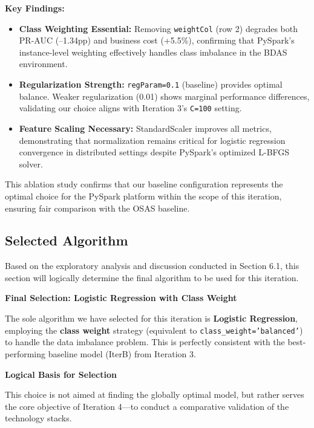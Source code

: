 \documentclass[sigplan,screen]{acmart}
\begin{document}
\textbf{Key Findings:}
\begin{itemize}
\item \textbf{Class Weighting Essential:} Removing \texttt{weightCol} (row 2) degrades both PR-AUC (--1.34pp) and business cost (+5.5\%), confirming that PySpark's instance-level weighting effectively handles class imbalance in the BDAS environment.
\item \textbf{Regularization Strength:} \texttt{regParam=0.1} (baseline) provides optimal balance. Weaker regularization (0.01) shows marginal performance differences, validating our choice aligns with Iteration 3's \texttt{C=100} setting.
\item \textbf{Feature Scaling Necessary:} StandardScaler improves all metrics, demonstrating that normalization remains critical for logistic regression convergence in distributed settings despite PySpark's optimized L-BFGS solver.
\end{itemize}

This ablation study confirms that our baseline configuration represents the optimal choice for the PySpark platform within the scope of this iteration, ensuring fair comparison with the OSAS baseline.

\subsection{Selected Algorithm}

Based on the exploratory analysis and discussion conducted in Section 6.1, this section will logically determine the final algorithm to be used for this iteration.

\textbf{Final Selection: Logistic Regression with Class Weight}

The sole algorithm we have selected for this iteration is \textbf{Logistic Regression}, employing the \textbf{class weight} strategy (equivalent to \texttt{class\_weight='balanced'}) to handle the data imbalance problem. This is perfectly consistent with the best-performing baseline model (IterB) from Iteration 3.

\textbf{Logical Basis for Selection}

This choice is not aimed at finding the globally optimal model, but rather serves the core objective of Iteration 4---to conduct a comparative validation of the technology stacks.
\end{document}
